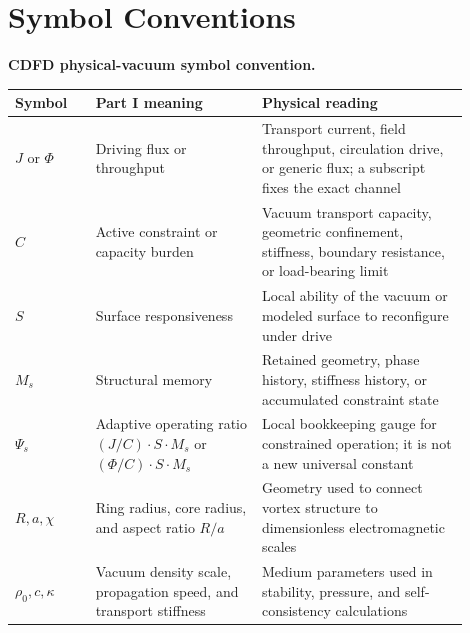 \documentclass[11pt]{article}
\begin{document}
\section*{Symbol Conventions}

\noindent\textbf{CDFD physical-vacuum symbol convention.}
\begin{center}
{\small
\begin{tabular}{p{0.16\linewidth}p{0.33\linewidth}p{0.41\linewidth}}
\hline
Symbol & Part I meaning & Physical reading \\
\hline
$J$ or $\Phi$ & Driving flux or throughput & Transport current, field throughput, circulation drive, or generic flux; a subscript fixes the exact channel \\
$C$ & Active constraint or capacity burden & Vacuum transport capacity, geometric confinement, stiffness, boundary resistance, or load-bearing limit \\
$S$ & Surface responsiveness & Local ability of the vacuum or modeled surface to reconfigure under drive \\
$M_s$ & Structural memory & Retained geometry, phase history, stiffness history, or accumulated constraint state \\
$\Psi_s$ & Adaptive operating ratio $(J/C)\cdot S\cdot M_s$ or $(\Phi/C)\cdot S\cdot M_s$ & Local bookkeeping gauge for constrained operation; it is not a new universal constant \\
$R,a,\chi$ & Ring radius, core radius, and aspect ratio $R/a$ & Geometry used to connect vortex structure to dimensionless electromagnetic scales \\
$\rho_0,c,\kappa$ & Vacuum density scale, propagation speed, and transport stiffness & Medium parameters used in stability, pressure, and self-consistency calculations \\
\hline
\end{tabular}
}
\end{center}
\end{document}
